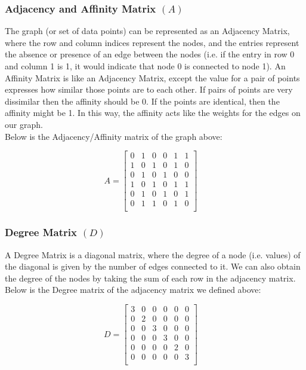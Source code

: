 \documentclass{article}
\begin{document}
        \subsubsection{Adjacency and Affinity Matrix $(A)$}
        The graph (or set of data points) can be represented as an Adjacency Matrix, where the row and column indices represent the nodes, and the entries represent the absence or presence of an edge between the nodes (i.e. if the entry in row 0 and column 1 is 1, it would indicate that node 0 is connected to node 1).
        An Affinity Matrix is like an Adjacency Matrix, except the value for a pair of points expresses how similar those points are to each other. If pairs of points are very dissimilar then the affinity should be 0. If the points are identical, then the affinity might be 1. In this way, the affinity acts like the weights for the edges on our graph.\\
        
        \noindent Below is the Adjacency/Affinity matrix of the graph above:
        
        $$ A = 
    	\begin{bmatrix} 
    	0 & 1 & 0 & 0 & 1 & 1 \\
    	1 & 0 & 1 & 0 & 1 & 0 \\
    	0 & 1 & 0 & 1 & 0 & 0 \\
     	1 & 0 & 1 & 0 & 1 & 1 \\
      	0 & 1 & 0 & 1 & 0 & 1 \\
       	0 & 1 & 1 & 0 & 1 & 0 \\
    	\end{bmatrix}
    	\quad
        $$
        \subsubsection{Degree Matrix $(D)$}
        A Degree Matrix is a diagonal matrix, where the degree of a node (i.e. values) of the diagonal is given by the number of edges connected to it. We can also obtain the degree of the nodes by taking the sum of each row in the adjacency matrix.\\
        
        \noindent Below is the Degree matrix of the adjacency matrix we defined above:
        
        $$ D = 
    	\begin{bmatrix} 
    	3 & 0 & 0 & 0 & 0 & 0 \\
    	0 & 2 & 0 & 0 & 0 & 0 \\
    	0 & 0 & 3 & 0 & 0 & 0 \\
     	0 & 0 & 0 & 3 & 0 & 0 \\
      	0 & 0 & 0 & 0 & 2 & 0 \\
       	0 & 0 & 0 & 0 & 0 & 3 \\
    	\end{bmatrix}
    	\quad
        $$
\end{document}
